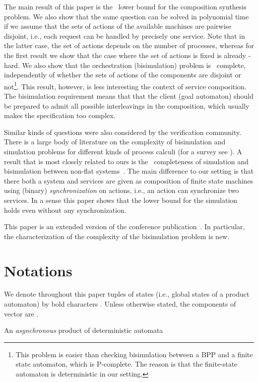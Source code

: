 \documentclass{LMCS}
\theoremstyle{plain}\newtheorem{remark}{Remark}
\theoremstyle{plain}\newtheorem{lemma}[thm]{Lemma}
\begin{document}
The main result of this paper is the \EXPTIME\ lower bound for the
composition synthesis problem. We also show that the same question can
be solved in polynomial time if we assume that the sets of actions of
the available machines are pairwise disjoint, i.e., each request can
be handled by precisely one service. Note that in the latter case, the
set of actions depends on the number of processes, whereas for the
first result we show that the case where the set of actions is fixed
is already \EXPTIME-hard. We also show that the orchestration
(bisimulation) problem
is \NLOGSPACE\ complete, independently of whether the sets of actions
of the components are disjoint or not\footnote{This problem is easier
  than checking bisimulation between a BPP and a finite state
  automaton, which is P-complete. The reason is that the finite-state
automaton is deterministic in our setting.}. This result, however, is less
interesting the context of service composition. The bisimulation
requirement means that that the client (goal automaton) should be
prepared to admit all possible interleavings in the composition, which
usually makes the specification too complex.

Similar kinds of questions were also considered by the verification
community. There is a large body of literature on the complexity of
bisimulation and simulation problems for different kinds of process
calculi (for a survey see \cite{Srba}). A result that is most closely
related to ours is the 
\EXPTIME\ completeness of simulation and bisimulation between non-flat
systems~\cite{LarSch00}. The main difference to our setting is that
there both a system and services are given as composition of finite state
machines using (binary) \emph{synchronization} on actions, i.e., an
action can synchronize two services. In a sense this paper shows that
the lower bound for the simulation holds even without any
synchronization.  

This paper is an extended version of the conference
publication~\cite{mw07}. In particular, the
characterization of the complexity of the bisimulation problem is new.


\section{Notations}
We denote throughout this paper tuples of states (i.e., global states
of a product automaton)  by bold characters
. Unless otherwise stated, the
components of  vector  are .

An \emph{asynchronous} product of  deterministic automata 
\end{document}
